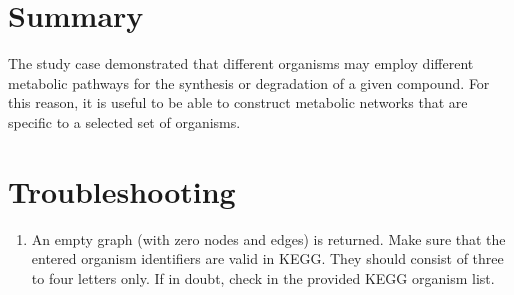 \section{Summary}

The study case demonstrated that different organisms may employ different metabolic pathways for the synthesis or
degradation of a given compound. For this reason, it is useful to be able to construct metabolic networks that are
specific to a selected set of organisms.

\section{Troubleshooting}

\begin{enumerate}

\item An empty graph (with zero nodes and edges) is returned.
Make sure that the entered organism identifiers are valid in KEGG.
They should consist of three to four letters only. If in doubt,
check in the provided KEGG organism list.

\end{enumerate}
